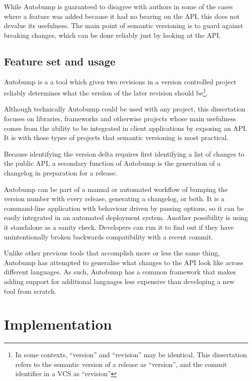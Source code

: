 \documentclass{l4proj}
\begin{document}
While Autobump is guaranteed to disagree with authors in some of the
cases where a feature was added because it had no bearing on the API,
this does not devalue its usefulness. The main point of semantic
versioning is to guard against breaking changes, which can be done
reliably just by looking at the API.

\section{Feature set and usage}


Autobump is a a tool which given two revisions in a version
controlled project reliably determines what the version of the later
revision should be\footnote{In some contexts, ``version'' and
``revision'' may be identical. This dissertation refers to the
semantic version of a release as ``version'', and the commit
identifier in a VCS as ``revision''}.

Although technically Autobump could be used with any project, this
dissertation focuses on libraries, frameworks and otherwise projects
whose main usefulness comes from the ability to be integrated in
client applications by exposing an API. It is with those types of
projects that semantic versioning is most practical.

Because identifying the version delta requires first identifying a
list of changes to the public API, a secondary function of Autobump is
the generation of a changelog in preparation for a release.

Autobump can be part of a manual or automated workflow of bumping the
version number with every release, generating a changelog, or both. It
is a command-line application with behaviour driven by passing
options, so it can be easily integrated in an automated deployment
system. Another possibility is using it standalone as a sanity check.
Developers can run it to find out if they have unintentionally broken
backwards compatibility with a recent commit.

Unlike other previous tools that accomplish more or less the same
thing, Autobump has attempted to generalise what changes to the API look
like across different languages. As such, Autobump has a common
framework that makes adding support for additional languages less
expensive than developing a new tool from scratch.

\chapter{Implementation}
\label{Implementation}
\end{document}
